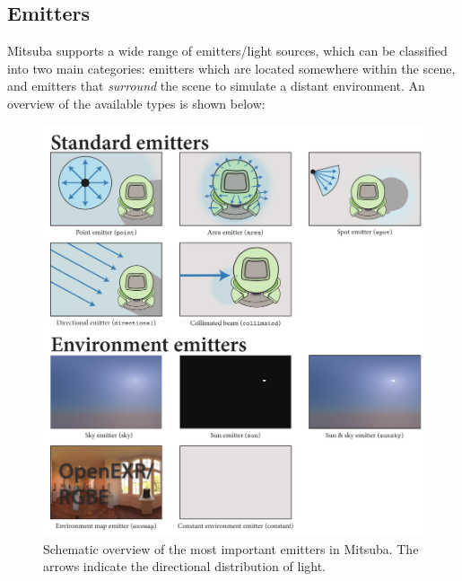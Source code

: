 \newpage
\subsection{Emitters}
\label{sec:emitters}
Mitsuba supports a wide range of emitters/light sources, which can be classified
into two main categories: emitters which are located somewhere within the scene, and emitters
that \emph{surround} the scene to simulate a distant environment. An overview of the available
types is shown below:
\begin{figure}[h!]
\centering
\includegraphics[width=15.5cm]{images/emitter_overview.pdf}
\caption{
	Schematic overview of the most important emitters in Mitsuba.
	The arrows indicate the directional distribution of light.
}
\end{figure}
